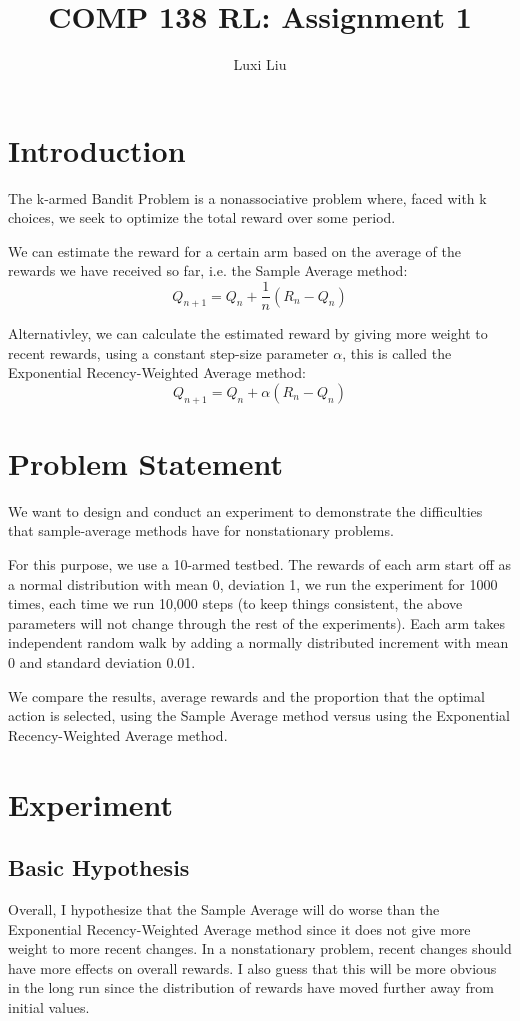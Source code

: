 \documentclass{article}
\title{COMP 138 RL: Assignment 1}
\author{Luxi Liu}
\begin{document}
\maketitle

\section{Introduction}
The k-armed Bandit Problem is a nonassociative problem where, faced with k choices, we seek to optimize the total reward over some period. 

We can estimate the reward for a certain arm based on the average of the rewards we have received so far, i.e. the Sample Average method: $$Q_{n+1} = Q_n + \frac{1}{n} (R_n - Q_n)$$

Alternativley, we can calculate the estimated reward by giving more weight to recent rewards, using a constant step-size parameter $\alpha$, this is called the Exponential Recency-Weighted Average method: $$Q_{n+1} = Q_n + \alpha (R_n - Q_n)$$

\section{Problem Statement}
We want to design and conduct an experiment to demonstrate the
difficulties that sample-average methods have for nonstationary problems. 

For this purpose, we use a 10-armed testbed. The rewards of each arm start off as a normal distribution with mean 0, deviation 1, we run the experiment for 1000 times, each time we run 10,000 steps (to keep things consistent, the above parameters will not change through the rest of the experiments). Each arm takes independent random walk by adding a normally distributed increment with mean 0 and standard deviation 0.01. 

We compare the results, average rewards and the proportion that the optimal action is selected, using the Sample Average method versus using the Exponential Recency-Weighted Average method.

\section{Experiment}
\subsection{Basic Hypothesis}
Overall, I hypothesize that the Sample Average will do worse than the Exponential Recency-Weighted Average method since it does not give more weight to more recent changes. In a nonstationary problem, recent changes should have more effects on overall rewards. I also guess that this will be more obvious in the long run since the distribution of rewards have moved further away from initial values.
\end{document}
